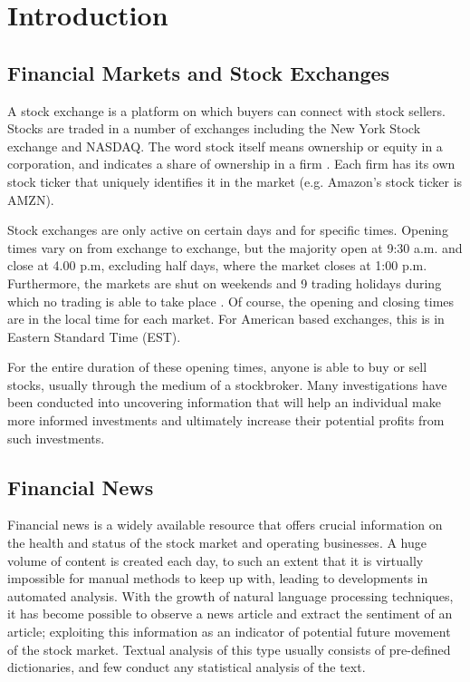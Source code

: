 
\chapter{Introduction}
\label{chap:context}
\section{Financial Markets and Stock Exchanges}
A stock exchange is a platform on which buyers can connect with stock sellers. Stocks are traded in a number of exchanges including the New York Stock exchange and NASDAQ. The word stock itself means ownership or equity in a corporation, and indicates a share of ownership in a firm \parencite{stock-market}. Each firm has its own stock ticker that uniquely identifies it in the market (e.g. Amazon's stock ticker is AMZN).

Stock exchanges are only active on certain days and for specific times. Opening times vary on from exchange to exchange, but the majority open at 9:30 a.m. and close at 4.00 p.m, excluding half days, where the market closes at 1:00 p.m. Furthermore, the markets are shut on weekends and 9 trading holidays during which no trading is able to take place \parencite{stock-opening-hours}. Of course, the opening and closing times are in the local time for each market. For American based exchanges, this is in Eastern Standard Time (EST).

For the entire duration of these opening times, anyone is able to buy or sell stocks, usually through the medium of a stockbroker. Many investigations have been conducted into uncovering information that will help an individual make more informed investments and ultimately increase their potential profits from such investments.

\section{Financial News}
Financial news is a widely available resource that offers crucial information on the health and status of the stock market and operating businesses. A huge volume of content is created each day, to such an extent that it is virtually impossible for manual methods to keep up with, leading to developments in automated analysis. With the growth of natural language processing techniques, it has become possible to observe a news article and extract the sentiment of an article; exploiting this information as an indicator of potential future movement of the stock market. Textual analysis of this type usually consists of pre-defined dictionaries, and few conduct any statistical analysis of the text.

